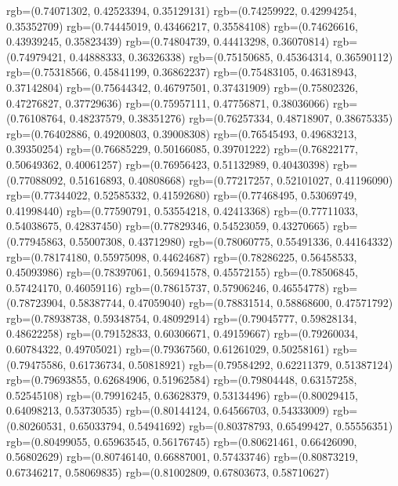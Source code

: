 {{        rgb=(0.74071302, 0.42523394, 0.35129131)
        rgb=(0.74259922, 0.42994254, 0.35352709)
        rgb=(0.74445019, 0.43466217, 0.35584108)
        rgb=(0.74626616, 0.43939245, 0.35823439)
        rgb=(0.74804739, 0.44413298, 0.36070814)
        rgb=(0.74979421, 0.44888333, 0.36326338)
        rgb=(0.75150685, 0.45364314, 0.36590112)
        rgb=(0.75318566, 0.45841199, 0.36862237)
        rgb=(0.75483105, 0.46318943, 0.37142804)
        rgb=(0.75644342, 0.46797501, 0.37431909)
        rgb=(0.75802326, 0.47276827, 0.37729636)
        rgb=(0.75957111, 0.47756871, 0.38036066)
        rgb=(0.76108764, 0.48237579, 0.38351276)
        rgb=(0.76257334, 0.48718907, 0.38675335)
        rgb=(0.76402886, 0.49200803, 0.39008308)
        rgb=(0.76545493, 0.49683213, 0.39350254)
        rgb=(0.76685229, 0.50166085, 0.39701222)
        rgb=(0.76822177, 0.50649362, 0.40061257)
        rgb=(0.76956423, 0.51132989, 0.40430398)
        rgb=(0.77088092, 0.51616893, 0.40808668)
        rgb=(0.77217257, 0.52101027, 0.41196090)
        rgb=(0.77344022, 0.52585332, 0.41592680)
        rgb=(0.77468495, 0.53069749, 0.41998440)
        rgb=(0.77590791, 0.53554218, 0.42413368)
        rgb=(0.77711033, 0.54038675, 0.42837450)
        rgb=(0.77829346, 0.54523059, 0.43270665)
        rgb=(0.77945863, 0.55007308, 0.43712980)
        rgb=(0.78060775, 0.55491336, 0.44164332)
        rgb=(0.78174180, 0.55975098, 0.44624687)
        rgb=(0.78286225, 0.56458533, 0.45093986)
        rgb=(0.78397061, 0.56941578, 0.45572155)
        rgb=(0.78506845, 0.57424170, 0.46059116)
        rgb=(0.78615737, 0.57906246, 0.46554778)
        rgb=(0.78723904, 0.58387744, 0.47059040)
        rgb=(0.78831514, 0.58868600, 0.47571792)
        rgb=(0.78938738, 0.59348754, 0.48092914)
        rgb=(0.79045777, 0.59828134, 0.48622258)
        rgb=(0.79152833, 0.60306671, 0.49159667)
        rgb=(0.79260034, 0.60784322, 0.49705021)
        rgb=(0.79367560, 0.61261029, 0.50258161)
        rgb=(0.79475586, 0.61736734, 0.50818921)
        rgb=(0.79584292, 0.62211379, 0.51387124)
        rgb=(0.79693855, 0.62684906, 0.51962584)
        rgb=(0.79804448, 0.63157258, 0.52545108)
        rgb=(0.79916245, 0.63628379, 0.53134496)
        rgb=(0.80029415, 0.64098213, 0.53730535)
        rgb=(0.80144124, 0.64566703, 0.54333009)
        rgb=(0.80260531, 0.65033794, 0.54941692)
        rgb=(0.80378793, 0.65499427, 0.55556351)
        rgb=(0.80499055, 0.65963545, 0.56176745)
        rgb=(0.80621461, 0.66426090, 0.56802629)
        rgb=(0.80746140, 0.66887001, 0.57433746)
        rgb=(0.80873219, 0.67346217, 0.58069835)
        rgb=(0.81002809, 0.67803673, 0.58710627)
}}
